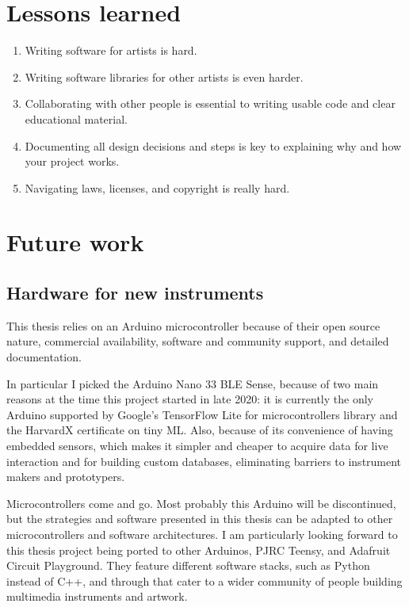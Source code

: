 \section{Lessons learned}

\begin{enumerate}
  \item Writing software for artists is hard.
  \item Writing software libraries for other artists is even harder.
  \item Collaborating with other people is essential to writing usable code and clear educational material.
  \item Documenting all design decisions and steps is key to explaining why and how your project works.
  \item Navigating laws, licenses, and copyright is really hard.
\end{enumerate}

\section{Future work}

\subsection{Hardware for new instruments}

This thesis relies on an Arduino microcontroller because of their open source nature, commercial availability, software and community support, and detailed documentation.

In particular I picked the Arduino Nano 33 \acrshort{BLE} Sense, because of two main reasons at the time this project started in late 2020: it is currently the only Arduino supported by Google's TensorFlow Lite for microcontrollers library and the HarvardX certificate on tiny \acrshort{ML}. Also, because of its convenience of having embedded sensors, which makes it simpler and cheaper to acquire data for live interaction and for building custom databases, eliminating barriers to instrument makers and prototypers.

Microcontrollers come and go. Most probably this Arduino will be discontinued, but the strategies and software presented in this thesis can be adapted to other microcontrollers and software architectures. I am particularly looking forward to this thesis project being ported to other Arduinos, PJRC Teensy, and Adafruit Circuit Playground. They feature different software stacks, such as Python instead of C++, and through that cater to a wider community of people building multimedia instruments and artwork.


